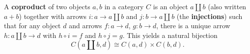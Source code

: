 A \textbf{coproduct} of two objects $a, b$ in a category $C$ is an object $a \amalg b$ (also written $a + b$) together with arrows $i: a \to a \amalg b$ and $j: b \to a \amalg b$ (the \textbf{injections}) such that for any object $d$ and arrows $f: a \to d$, $g: b \to d$, there is a unique arrow $h: a \amalg b \to d$ with $h \circ i = f$ and $h \circ j = g$. This yields a natural bijection
$$C(a \amalg b, d) \cong C(a, d) \times C(b, d).$$